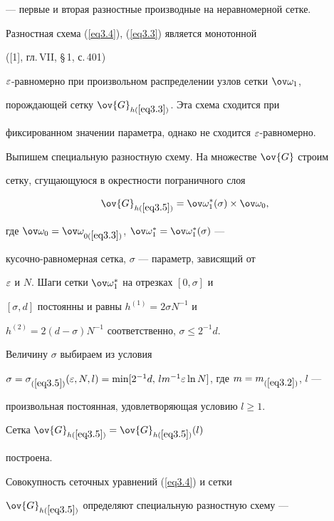 --- первые и вторая разностные производные на неравномерной сетке.





Разностная схема (\ref{eq3.4}), (\ref{eq3.3}) является монотонной


([1], гл.\,VII, \S\,1, с.\,401)


$\varepsilon$-равномерно при произвольном распределении узлов сетки $\ovo_1$,


порождающей сетку $\ov{G}_{h(\ref{eq3.3})}$. Эта схема сходится при


фиксированном значении параметра, однако не сходится $\varepsilon$-равномерно.





Выпишем специальную разностную схему. На множестве $\ov{G}$ строим


сетку, сгущающуюся в окрестности пограничного слоя


\begin{equation}


\label{eq3.5}


\ov{G}_{h(\ref{eq3.5})}=\ovo_1^*(\sigma)\times \ovo_0,


\end{equation}


где $\ovo_0=\ovo_{0(\ref{eq3.3})}$, $\ovo_1^*=\ovo_1^*(\sigma)$ ---


кусочно-равномерная сетка, $\sigma$ --- параметр, зависящий от


$\varepsilon$ и $N$. Шаги сетки $\ovo_1^*$ на отрезках $[0, \sigma]$ и


$[\sigma, d]$ постоянны и равны $h^{(1)}=2\sigma N^{-1}$ и


$h^{(2)}=2(d-\sigma)N^{-1}$ соответственно, $\sigma\le 2^{-1}d$.


Величину $\sigma$ выбираем из условия


$\sigma=\sigma_{(\ref{eq3.5})}(\eps,N,l)=\min[2^{-1}d,\,l


m^{-1}\eps\ln N]$, где $m=m_{(\ref{eq3.2})}$, $l$ ---


произвольная постоянная, удовлетворяющая условию $l\ge 1$.


Сетка $\ov{G}_{h(\ref{eq3.5})}=\ov{G}_{h(\ref{eq3.5})}(l)$


построена.





Совокупность сеточных уравнений (\ref{eq3.4}) и сетки


$\ov{G}_{h(\ref{eq3.5})}$ определяют специальную разностную схему ---


